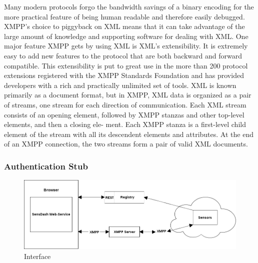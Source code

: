 Many modern protocols forgo the bandwidth savings of a binary encoding for the more practical
feature of being human readable and therefore easily debugged. XMPP’s choice to piggyback on
XML means that it can take advantage of the large amount of knowledge and supporting software
for dealing with XML.
One major feature XMPP gets by using XML is XML’s extensibility. It is extremely easy to add new
features to the protocol that are both backward and forward compatible. This extensibility is put to
great use in the more than 200 protocol extensions registered with the XMPP Standards Foundation
and has provided developers with a rich and practically unlimited set of tools.
XML is known primarily as a document format, but in XMPP, XML data is organized as a pair
of streams, one stream for each direction of communication. Each XML stream consists of an
opening element, followed by XMPP stanzas and other top-level elements, and then a closing ele-
ment. Each XMPP stanza is a first-level child element of the stream with all its descendent elements
and attributes. At the end of an XMPP connection, the two streams form a pair of valid XML
documents.
    \subsubsection{Authentication Stub}




\begin{figure}[!ht]
\centering
\includegraphics[scale=0.5]{images/Interface.png}   
\caption[Interface]{Interface}
\label{img:interfaces}                           
\end{figure}

